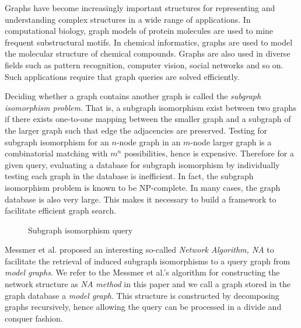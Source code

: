 Graphs have become increasingly important structures for representing and understanding complex structures in a wide range of applications.
In computational biology, graph models of protein molecules are used to mine frequent substructural motifs\cite{Huan2005}. In chemical informatics, graphs are used to model the molecular structure of chemical compounds. Graphs are also used in diverse fields such as pattern recognition, computer vision, social networks and so on. Such applications require that graph queries are solved efficiently.

Deciding whether a graph contains another graph is called the \textit{subgraph isomorphism problem}. That is, a subgraph isomorphism exist between two graphs if there exists one-to-one mapping between the smaller graph and a subgraph of the larger graph such that edge the adjacencies are preserved. Testing for subgraph isomorphism for an $n$-node graph in an $m$-node larger graph is a combinatorial matching with $m^n$ possibilities, hence is expensive. Therefore for a given query, evaluating a database for subgraph  isomorphism by individually testing each graph  in the database is inefficient.  In fact, the subgraph isomorphism problem is known to be NP-complete\cite{np-complete}. In  many 
cases, the graph database is also very large. This makes it necessary to build a framework to facilitate efficient graph search.



\begin{figure}
\centering

\caption{Subgraph isomorphism query}
\label{fig:fig11}
\end{figure}


Messmer et al.\cite{messmer_bunke2000_ieee_kde} proposed an interesting so-called \textit{Network Algorithm, NA} to facilitate the retrieval of induced subgraph isomorphisms 
to a query graph from \textit{model graphs}. We refer to the Messmer et al.'s algorithm for constructing the network structure as \textit{NA method} in this paper and we call a graph stored in the graph database a \textit{model graph}.
This structure is constructed by decomposing graphs recursively, hence allowing the query can be processed in a divide and conquer fashion.


